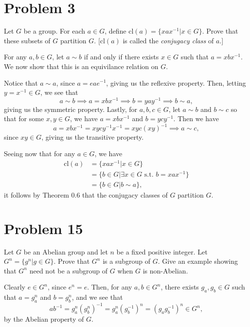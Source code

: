 \documentclass[12pt]{article}
\newcommand{\cl}{\mbox{cl}}
\begin{document}
\section*{Problem 3}

Let $G$ be a group.  For each $a\in G$, define $\cl(a)=\{xax^{-1}|x\in G\}$.
Prove that these subsets of $G$ partition $G$.  [$\cl(a)$ is called the {\it conjugacy
class} of $a$.]

For any $a,b\in G$, let $a\sim b$ if and only if there exists $x\in G$
such that $a=xbx^{-1}$.  We now show that this is an equivilance relation on $G$.

Notice that $a\sim a$, since $a=eae^{-1}$, giving us the reflexive property.
Then, letting $y=x^{-1}\in G$, we see that
\begin{equation*}
a\sim b\implies a=xbx^{-1}\implies b=yay^{-1}\implies b\sim a,
\end{equation*}
giving us the symmetric property.  Lastly, for $a,b,c\in G$,
let $a\sim b$ and $b\sim c$ so that for some $x,y\in G$, we have
$a=xbx^{-1}$ and $b=ycy^{-1}$.  Then we have
\begin{equation*}
a=xbx^{-1}=xycy^{-1}x^{-1}=xyc(xy)^{-1}\implies a\sim c,
\end{equation*}
since $xy\in G$, giving us the transitive property.

Seeing now that for any $a\in G$, we have
\begin{align*}
\cl(a)&=\{xax^{-1}|x\in G\}\\
 &= \{b\in G|\mbox{$\exists x\in G$ s.t. $b=xax^{-1}$}\}\\
 &= \{b\in G|b\sim a\},
\end{align*}
it follows by Theorem 0.6 that the conjugacy classes
of $G$ partition $G$.

\section*{Problem 15}

Let $G$ be an Abelian group and let $n$ be a fixed positive integer.  Let
$G^n=\{g^n|g\in G\}$.  Prove that $G^n$ is a subgroup of $G$.  Give an example
showing that $G^n$ need not be a subgroup of $G$ when $G$ is non-Abelian.

Clearly $e\in G^n$, since $e^n=e$.  Then, for any $a,b\in G^n$, there exists
$g_a,g_b\in G$ such that $a=g_a^n$ and $b=g_b^n$, and we see that
\begin{equation*}
ab^{-1} = g_a^n(g_b^n)^{-1} = g_a^n(g_b^{-1})^n = (g_ag_b^{-1})^n \in G^n,
\end{equation*}
by the Abelian property of $G$.
\end{document}
